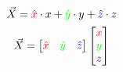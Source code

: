 \documentclass[preview]{standalone}
\begin{document}
$$\vec{X} = \textcolor[HTML]{FF0000}{\hat{x}}\cdot x + \textcolor[HTML]{00FF00}{\hat{y}}\cdot y + \textcolor[HTML]{0000FF}{\hat{z}}\cdot z$$
$$\vec{X} = \begin{bmatrix}\textcolor[HTML]{FF0000}{\hat{x}}&\textcolor[HTML]{00FF00}{\hat{y}}&\textcolor[HTML]{0000FF}{\hat{z}}\end{bmatrix}\begin{bmatrix}\textcolor[HTML]{FF0000}{x}\\\textcolor[HTML]{00FF00}{y}\\\textcolor[HTML]{0000FF}{z}\end{bmatrix}$$
\end{document}
